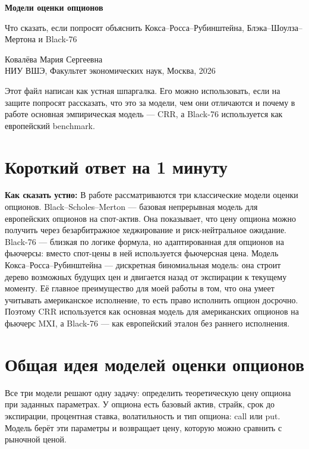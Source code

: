 \documentclass[11pt,a4paper]{article}
\newcommand{\speechbox}[1]{%
  \noindent\colorbox{softblue}{%
    \parbox{\dimexpr\linewidth-2\fboxsep\relax}{\textbf{Как сказать устно:} #1}%
  }\par\vspace{0.2em}
}
\begin{document}
\begin{center}
{\Large\bfseries Модели оценки опционов\par}
\vspace{0.35em}
{\large Что сказать, если попросят объяснить Кокса--Росса--Рубинштейна, Блэка--Шоулза--Мертона и Black-76\par}
\vspace{0.45em}
Ковалёва Мария Сергеевна \\
НИУ ВШЭ, Факультет экономических наук, Москва, 2026
\end{center}

\vspace{0.5em}
Этот файл написан как устная шпаргалка. Его можно использовать, если на защите попросят рассказать, что это за модели, чем они отличаются и почему в работе основная эмпирическая модель --- CRR, а Black-76 используется как европейский benchmark.

\tableofcontents
\newpage

\section{Короткий ответ на 1 минуту}

\speechbox{В работе рассматриваются три классические модели оценки опционов. Black--Scholes--Merton --- базовая непрерывная модель для европейских опционов на спот-актив. Она показывает, что цену опциона можно получить через безарбитражное хеджирование и риск-нейтральное ожидание. Black-76 --- близкая по логике формула, но адаптированная для опционов на фьючерсы: вместо спот-цены в ней используется фьючерсная цена. Модель Кокса--Росса--Рубинштейна --- дискретная биномиальная модель: она строит дерево возможных будущих цен и двигается назад от экспирации к текущему моменту. Её главное преимущество для моей работы в том, что она умеет учитывать американское исполнение, то есть право исполнить опцион досрочно. Поэтому CRR используется как основная модель для американских опционов на фьючерс MXI, а Black-76 --- как европейский эталон без раннего исполнения.}

\section{Общая идея моделей оценки опционов}

Все три модели решают одну задачу: определить теоретическую цену опциона при заданных параметрах. У опциона есть базовый актив, страйк, срок до экспирации, процентная ставка, волатильность и тип опциона: call или put. Модель берёт эти параметры и возвращает цену, которую можно сравнить с рыночной ценой.
\end{document}
